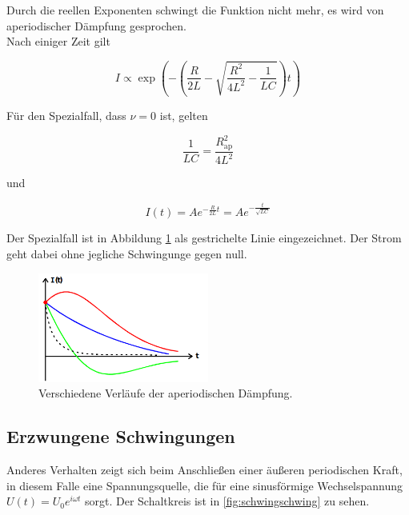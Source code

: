     \noindent Durch die reellen Exponenten schwingt die Funktion nicht mehr, es
    wird von aperiodischer Dämpfung gesprochen. \\
    Nach einiger Zeit gilt
    
    \begin{equation*}
        I \propto \exp \left( - \left( \frac{R}{2L} - \sqrt{ \frac{R^2}{4L^2} - \frac{1}{LC}} \right) t \right)
    \end{equation*}

    Für den Spezialfall, dass $\nu = 0$ ist, gelten

    \begin{equation}
        \frac{1}{LC} = \frac{R^2_{\text{ap}}}{4L^2}
        \label{eqn:spezialfall}
    \end{equation}

    und

    \begin{equation*}
        I(t) = A e^{-\frac{R}{2L}t} = A e^{- \frac{t}{\sqrt{LC}}}
    \end{equation*}

    Der Spezialfall ist in Abbildung \ref{fig:ape} als gestrichelte Linie eingezeichnet. 
    Der Strom geht dabei ohne jegliche Schwingunge gegen null.

    \begin{figure}
        \centering
        \includegraphics[width=0.5\textwidth]{aperiod.png}
        \caption{Verschiedene Verläufe der aperiodischen Dämpfung.\cite{anleitung}}
        \label{fig:ape}
    \end{figure}

\subsection{Erzwungene Schwingungen}
    Anderes Verhalten zeigt sich beim Anschließen einer äußeren periodischen Kraft,
    in diesem Falle eine Spannungsquelle, die für eine sinusförmige Wechselspannung
    $U(t) = U_0 e^{i \omega t}$
    sorgt. Der Schaltkreis ist in \ref{fig:schwingschwing} zu sehen.

